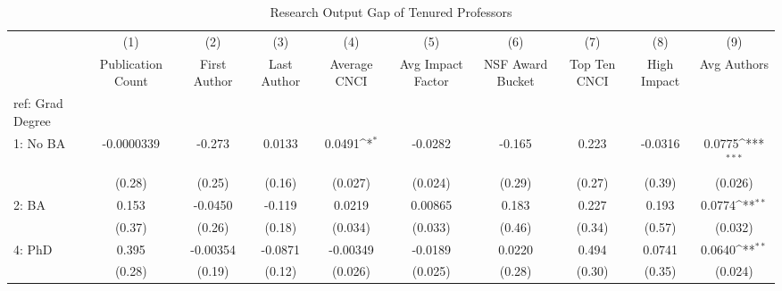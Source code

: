 \begin{table}[htbp]\centering
\def\sym#1{\ifmmode^{#1}\else\(^{#1}\)\fi}
\caption{Research Output Gap of Tenured Professors\label{tab1}}
\begin{tabular}{l*{9}{c}}
\hline\hline
  &\multicolumn{1}{c}{(1)}&\multicolumn{1}{c}{(2)}&\multicolumn{1}{c}{(3)}&\multicolumn{1}{c}{(4)}&\multicolumn{1}{c}{(5)}&\multicolumn{1}{c}{(6)}&\multicolumn{1}{c}{(7)}&\multicolumn{1}{c}{(8)}&\multicolumn{1}{c}{(9)}\\
  &\multicolumn{1}{c}{Publication Count}&\multicolumn{1}{c}{First Author}&\multicolumn{1}{c}{Last Author}&\multicolumn{1}{c}{Average CNCI}&\multicolumn{1}{c}{Avg Impact Factor}&\multicolumn{1}{c}{NSF Award Bucket}&\multicolumn{1}{c}{Top Ten CNCI}&\multicolumn{1}{c}{High Impact}&\multicolumn{1}{c}{Avg Authors}\\
\hline
ref: Grad Degree&                     &                     &                     &                     &                     &                     &                     &                     &                     \\
[1em]
1: No BA&  -0.0000339         &      -0.273         &      0.0133         &      0.0491\sym{*}  &     -0.0282         &      -0.165         &       0.223         &     -0.0316         &      0.0775\sym{***}\\
  &      (0.28)         &      (0.25)         &      (0.16)         &     (0.027)         &     (0.024)         &      (0.29)         &      (0.27)         &      (0.39)         &     (0.026)         \\
[1em]
2: BA&       0.153         &     -0.0450         &      -0.119         &      0.0219         &     0.00865         &       0.183         &       0.227         &       0.193         &      0.0774\sym{**} \\
  &      (0.37)         &      (0.26)         &      (0.18)         &     (0.034)         &     (0.033)         &      (0.46)         &      (0.34)         &      (0.57)         &     (0.032)         \\
[1em]
4: PhD&       0.395         &    -0.00354         &     -0.0871         &    -0.00349         &     -0.0189         &      0.0220         &       0.494         &      0.0741         &      0.0640\sym{**} \\
  &      (0.28)         &      (0.19)         &      (0.12)         &     (0.026)         &     (0.025)         &      (0.28)         &      (0.30)         &      (0.35)         &     (0.024)         \\

\end{tabular}
\end{table}
